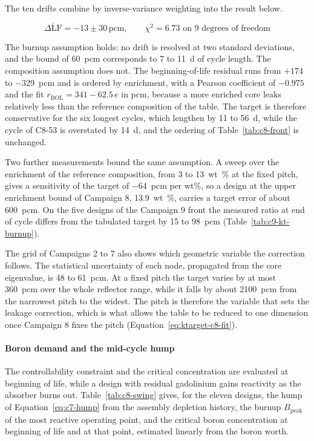 The ten drifts combine by inverse-variance weighting into the result
below.

\begin{equation}
\overline{\Delta\mathrm{LF}} = -13 \pm 30\,\mathrm{pcm},
\qquad \chi^2 = 6.73 \text{ on 9 degrees of freedom}
\label{eq:kt-comp}
\end{equation}

The burnup assumption holds: no drift is resolved at two standard
deviations, and the bound of \SI{60}{pcm} corresponds to 7 to
\SI{11}{d} of cycle length. The composition assumption does not. The
beginning-of-life residual runs from $+174$ to \SI{-329}{pcm} and is
ordered by enrichment, with a Pearson coefficient of $-0.975$ and the
fit $r_\mathrm{BOL} = 341 - 62.5\,e$ in pcm, because a more enriched
core leaks relatively less than the reference composition of the table.
The target is therefore conservative for the six longest cycles, which
lengthen by 11 to \SI{56}{d}, while the cycle of C8-53 is overstated by
\SI{14}{d}, and the ordering of Table~\ref{tab:c8-front} is unchanged.

Two further measurements bound the same assumption. A sweep over the
enrichment of the reference composition, from 3 to \SI{13}{wt\%} at the
fixed pitch, gives a sensitivity of the target of \SI{-64}{pcm} per
wt\%, so a design at the upper enrichment bound of Campaign 8,
\SI{13.9}{wt\%}, carries a target error of about \SI{600}{pcm}. On the
five designs of the Campaign 9 front the measured ratio at end of cycle
differs from the tabulated target by 15 to \SI{98}{pcm}
(Table~\ref{tab:c9-kt-burnup}).

The grid of Campaigns 2 to 7 also shows which geometric variable the
correction follows. The statistical uncertainty of each node,
propagated from the core eigenvalue, is 48 to \SI{61}{pcm}. At a fixed
pitch the target varies by at most \SI{360}{pcm} over the whole
reflector range, while it falls by about \SI{2100}{pcm} from the
narrowest pitch to the widest. The pitch is therefore the variable that
sets the leakage correction, which is what allows the table to be
reduced to one dimension once Campaign 8 fixes the pitch
(Equation~\eqref{eq:ktarget-c8-fit}).

\paragraph{Boron demand and the mid-cycle hump}
\label{sec:res-c8-swing}

The controllability constraint and the critical concentration are evaluated at
beginning of life, while a design with residual gadolinium gains
reactivity as the absorber burns out. Table~\ref{tab:c8-swing} gives,
for the eleven designs, the hump of Equation~\eqref{eq:c7-hump} from
the assembly depletion history, the burnup $B_\mathrm{peak}$ of the
most reactive operating point, and the critical boron concentration at
beginning of life and at that point, estimated linearly from the boron
worth.

